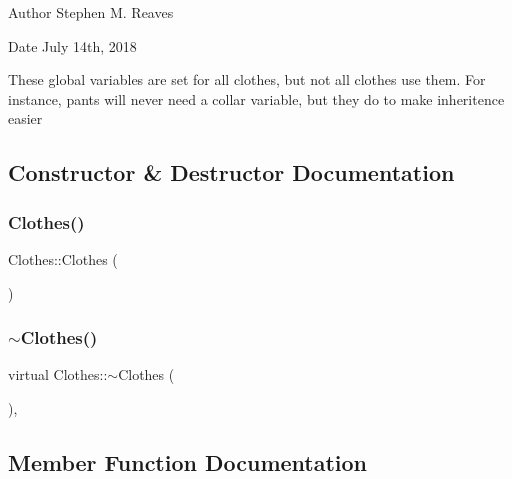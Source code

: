\begin{DoxyAuthor}{Author}
Stephen M. Reaves 
\end{DoxyAuthor}
\begin{DoxyDate}{Date}
July 14th, 2018
\end{DoxyDate}
These global variables are set for all clothes, but not all clothes use them. For instance, pants will never need a \textquotesingle{}collar\textquotesingle{} variable, but they do to make inheritence easier 

\subsection{Constructor \& Destructor Documentation}
\mbox{\label{classClothes_a3df0bb45365fe4b9c82fde551207aa18}} 
\subsubsection{\texorpdfstring{Clothes()}{Clothes()}}
{\footnotesize\ttfamily Clothes\+::\+Clothes (\begin{DoxyParamCaption}{ }\end{DoxyParamCaption})\hspace{0.3cm}{\ttfamily [inline]}}

\mbox{\label{classClothes_a90ab914d23c6870f19e387922f48fe88}} 
\subsubsection{\texorpdfstring{$\sim$\+Clothes()}{~Clothes()}}
{\footnotesize\ttfamily virtual Clothes\+::$\sim$\+Clothes (\begin{DoxyParamCaption}{ }\end{DoxyParamCaption})\hspace{0.3cm}{\ttfamily [inline]}, {\ttfamily [virtual]}}



\subsection{Member Function Documentation}
\mbox{\label{classClothes_a3f6dac172f333126d19010f85ec44e4c}} 
